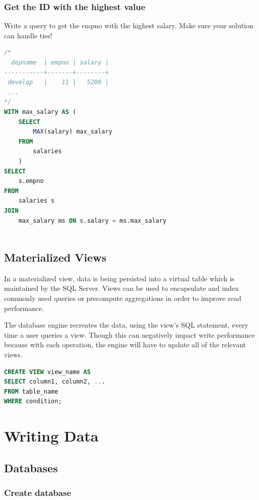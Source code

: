 \documentclass{article}
\begin{document}
\subsubsection{Get the ID with the highest value}

Write a query to get the empno with the highest salary. Make sure your solution can handle ties!

\vspace{8pt} \begin{lstlisting}[language=SQL]
/*
  depname  | empno | salary |     
-----------+-------+--------+
 develop   |    11 |   5200 | 
 ...
*/
WITH max_salary AS (
    SELECT 
        MAX(salary) max_salary
    FROM 
        salaries
    )
SELECT 
    s.empno
FROM 
    salaries s
JOIN 
    max_salary ms ON s.salary = ms.max_salary 
    
\end{lstlisting}

\subsection{Materialized Views}
In a materialized view, data is being persisted into a virtual table which is maintained by the SQL Server. Views can be used to encapsulate and index commonly used queries or precompute aggregations in order to improve read performance. 

The database engine recreates the data, using the view's SQL statement, every time a user queries a view. Though this can negatively impact write performance because with each operation, the engine will have to update all of the relevant views.

\vspace{8pt} \begin{lstlisting}[language=SQL]
CREATE VIEW view_name AS
SELECT column1, column2, ...
FROM table_name
WHERE condition;
\end{lstlisting}

\newpage
\section{Writing Data}

\subsection{Databases}
\subsubsection{Create database}
\end{document}
